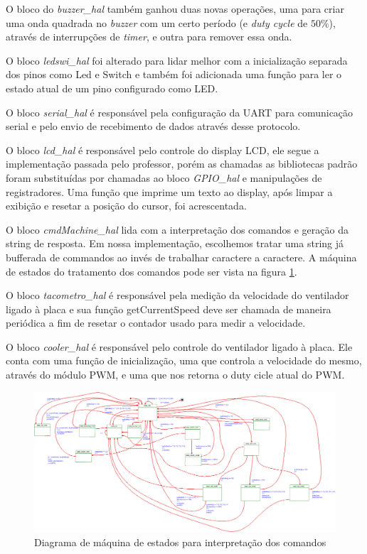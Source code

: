 \documentclass{article}
\begin{document}
O bloco do \textit{buzzer\_hal} também ganhou duas novas operações, uma para criar uma onda quadrada no \textit{buzzer} com um certo período (e \textit{duty cycle} de $50\%$), através de interrupções de \textit{timer}, e outra para remover essa onda.

O bloco \textit{ledswi\_hal} foi alterado para lidar melhor com a inicialização separada dos pinos como Led e Switch e também foi adicionada uma função para ler o estado atual de um pino configurado como LED.

O bloco \textit{serial\_hal} é responsável pela configuração da UART para comunicação serial e pelo envio de recebimento de dados através desse protocolo.

O bloco \textit{lcd\_hal} é responsável pelo controle do display LCD, ele segue a implementação passada pelo professor, porém as chamadas as bibliotecas padrão foram substituídas por chamadas ao bloco \textit{GPIO\_hal} e manipulações de registradores. Uma função que imprime um texto ao display, após limpar a exibição e resetar a posição do cursor, foi acrescentada.

O bloco \textit{cmdMachine\_hal} lida com a interpretação dos comandos e geração da string de resposta. Em nossa implementação, escolhemos tratar uma string já bufferada de commandos ao invés de trabalhar caractere a caractere. A máquina de estados do tratamento dos comandos pode ser vista na figura \ref{fig:estados}.

O bloco \textit{tacometro\_hal} é responsável pela medição da velocidade do ventilador ligado à placa e sua função getCurrentSpeed deve ser chamada de maneira periódica a fim de resetar o contador usado para medir a velocidade. 

O bloco \textit{cooler\_hal} é responsável pelo controle do ventilador ligado à placa. Ele conta com uma função de inicialização, uma que controla a velocidade do mesmo, através do módulo PWM, e uma que nos retorna o duty cicle atual do PWM.

\begin{figure}[H]
	\centering
	\includegraphics[width=1.5\linewidth, center]{estados}
	\caption{Diagrama de máquina de estados para interpretação dos comandos}
	\label{fig:estados}
\end{figure}
\end{document}
